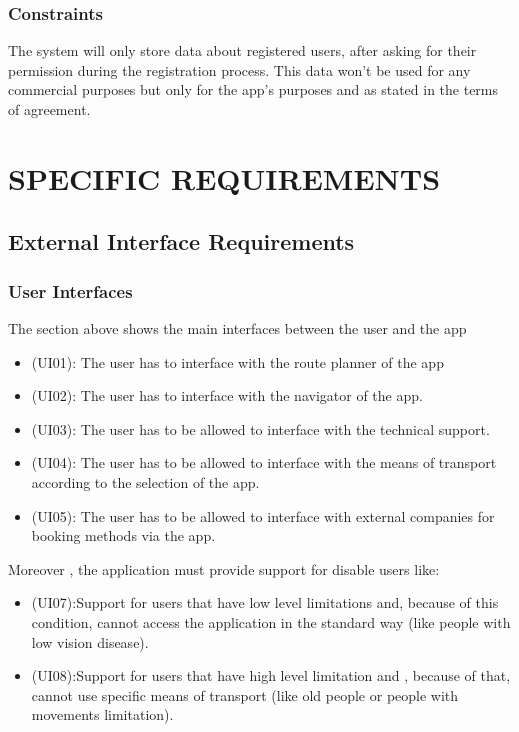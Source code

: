 \documentclass[a4paper,leqno]{book}
\begin{document}
\subsection{Constraints}
The system will only store data about registered users, after asking for their permission during the registration process. This data won't be used for any commercial purposes but only for the app's purposes and as stated in the terms of agreement.

\chapter{SPECIFIC REQUIREMENTS}

\section{External Interface Requirements}

\subsection{User Interfaces}
The section above shows the main interfaces between the user and the app 
\begin{itemize}
\item (UI01): The user has to interface with the route planner of the app
\item (UI02): The user has to interface with the navigator of the app.
\item (UI03): The user has to be allowed to interface with the technical support.
\item (UI04): The user has to be allowed to interface with the means of transport according to the selection of the app.
\item (UI05): The user has to be allowed to interface with external companies for booking methods via the app.
\end{itemize}

Moreover , the application must provide support for disable users like:
\begin{itemize}

\item (UI07):Support for users that have low level limitations and, because of this condition, cannot access the application in the standard way (like people with low vision disease). 
\item (UI08):Support for users that have high level limitation and , because of that, cannot use specific means of transport (like old people or people with movements limitation).

\end{itemize}
\end{document}
